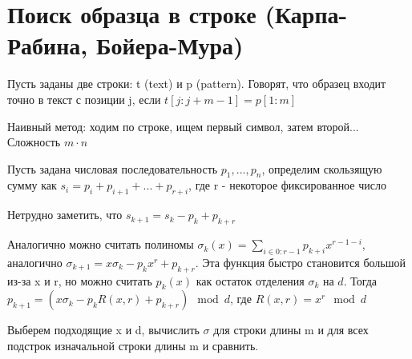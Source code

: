 \documentclass[discrete.tex]{subfiles}
\begin{document}
  \section{Поиск образца в строке (Карпа-Рабина, Бойера-Мура)}

  \begin{definition}
    Пусть заданы две строки: t (text) и p (pattern). Говорят, что образец входит точно в текст с позиции j, если $t[j:j+m-1] = p[1:m]$
  \end{definition}

  Наивный метод: ходим по строке, ищем первый символ, затем второй... Сложность $m \cdot n$

  \begin{definition}
    Пусть задана числовая последовательность $p_1,...,p_n$, определим скользящую сумму как $s_i=p_i+p_{i+1}+...+p_{r+i}$, где r - некоторое фиксированное число
  \end{definition}

  \begin{remark}
    Нетрудно заметить, что $s_{k+1} = s_k - p_k + p_{k+r}$
  \end{remark}

  \begin{remark}
    Аналогично можно считать полиномы $\sigma_k(x) = \sum_{i \in 0 : r-1} p_{k+i} x^{r-1-i}$, аналогично $\sigma_{k+1} = x \sigma_k - p_k x^r + p_{k+r}$. Эта функция быстро становится большой из-за x и r, но можно считать $p_k(x)$ как остаток отделения $\sigma_k$ на $d$. Тогда $p_{k+1} = (x \sigma_k - p_k R(x,r) + p_{k+r}) \mod d$, где $R(x,r) = x^r \mod d$
  \end{remark}

  \begin{alg}
    Выберем подходящие x и d, вычислить $\sigma$ для строки длины m и для всех подстрок изначальной строки длины m и сравнить.
  \end{alg}
\end{document}
